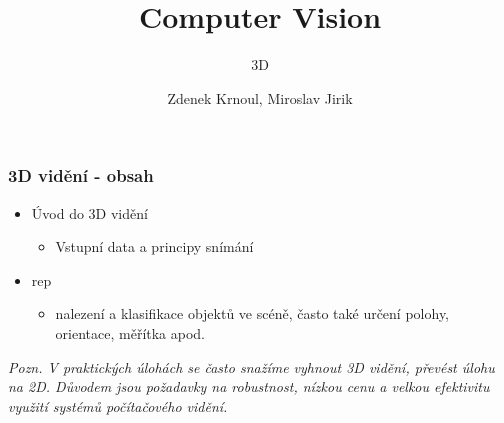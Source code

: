 \title{Computer Vision}
\subtitle{3D}
\author{Zdenek Krnoul, Miroslav Jirik}

\date{} %



\begingroup 
{}

\begin{frame}
	\titlepage
\end{frame}

\addtocounter{framenumber}{-1}
\expandafter\def\expandafter\insertshorttitle\expandafter{%
	\insertshorttitle \hfill \insertframenumber\,/\,\inserttotalframenumber
}


\begin{frame}
\frametitle{3D vidění - obsah}
\begin{itemize}
	\item Úvod do 3D vidění
    \begin{itemize}
        \item Vstupní data a principy snímání
    \end{itemize}
    \item rep
    \begin{itemize}
    \item nalezení a klasifikace objektů ve scéně, často také určení polohy, orientace, měřítka apod.
    \end{itemize}
\end{itemize}
\textit{Pozn. V praktických úlohách se často snažíme vyhnout 3D vidění, převést úlohu na 2D. Důvodem jsou požadavky na robustnost, nízkou cenu a velkou efektivitu využití systémů počítačového vidění.}
\end{frame}

